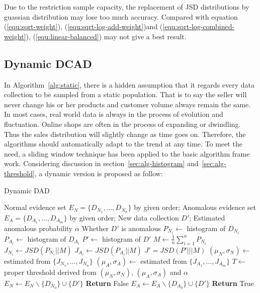 \documentclass[a4paper]{IEEEtran}
\begin{document}
			Due to the restriction sample capacity, the replacement of JSD distributions by guassian distribution may lose too much accuracy. Compared with equation (\ref{equ:sqrt-weight}), (\ref{equ:sqrt-log-add-weight})and (\ref{equ:sqrt-log-combined-weight}), (\ref{equ:linear-balanced}) may not give a best result.
		
		\subsection{Dynamic DCAD}
			In Algorithm~\ref{alg:static}, there is a hidden assumption that it regards every data collection to be sampled from a static population. That is to say the seller will never change his or her products and customer volume always remain the same. In most cases, real world data is always in the process of evolution and fluctuation. Online shops are often in the process of expanding or dwindling. Thus the sales distribution will slightly change as time goes on. Therefore, the algorithms should automatically adapt to the trend at any time. To meet the need, a sliding window technique has been applied to the basic algorithm frame work. Considering discussion in section~\ref{sec:alg-histogram} and~\ref{sec:alg-threshold}, a dynamic version is proposed as follow:
			
			\begin{algorithm}[!ht]
				\caption{Dynamic DAD}
				\label{alg:dynamic}
				\begin{algorithmic}[1]
					\Require Normal evidence set $E_N = \{D_{N_1}, \dots, D_{N_n}\}$ by given order; Anomalous evidence set $E_A = \{D_{A_1}, \dots, D_{A_m}\}$ by given order; New data collection $D'$; Estimated anomalous probability $\alpha$
					\Ensure Whether $D'$ is anomalous
						\State $P_{N_i} \gets$ histogram of $D_{N_i}$
					\EndFor
						\State $P_{A_i} \gets$ histogram of $D_{A_i}$
					\EndFor
					\State $P' \gets$ histogram of $D'$
					\State $M \gets \frac{1}{n}\sum_{i=1}^{n}P_{N_i}$
						\State $J_{N_i} \gets JSD(P_{N_i}||M)$
					\EndFor
						\State $J_{A_i} \gets JSD(P_{A_i}||M)$
					\EndFor
					\State $J' = JSD(P'|||M)$
					\State $(\mu_N, \sigma_N) \gets$ estimated from $\{J_{N_1}, \dots, J_{N_n}\}$
					\State $(\mu_A, \sigma_A) \gets$ estimated from $\{J_{A_1}, \dots, J_{A_m}\}$
					\State $T \gets$ proper threshold derived from $(\mu_N, \sigma_N)$, $(\mu_A, \sigma_A)$ and $\alpha$
						\State $E_N \gets E_N \backslash \{D_{N_0}\} \cup \{D'\}$\label{line:update-normal-evidence}
						\State \textbf{Return} False
					\Else
						\State $E_A \gets E_A \backslash \{D_{A_0}\} \cup \{D'\}$\label{line:update-anomalous-evidence}
						\State \textbf{Return} True
					\EndIf
				\end{algorithmic}
			\end{algorithm}
			
\end{document}
